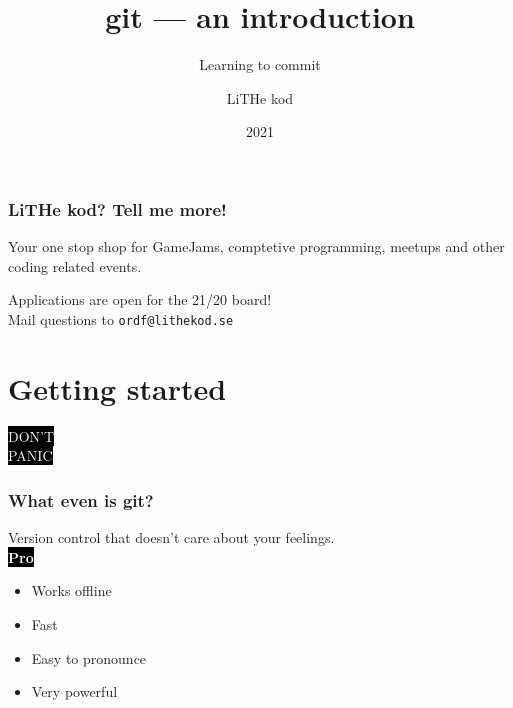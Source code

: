\documentclass{beamer}
\title[git]{git --- an introduction}
\subtitle{Learning to commit}
\author{LiTHe kod}
\date{2021}
\newcommand{\keyword}[1]{\hspace{-1.0em}\colorbox{black}{\textcolor{white}{\textbf{#1}\vphantom{Ep}}}\vspace{0.2em}} %
\begin{document}
\frame{\titlepage}
\frame{\tableofcontents}



\begin{frame}[fragile]
  \frametitle{LiTHe kod? Tell me more!}
  Your one stop shop for GameJams, comptetive programming, meetups and other coding related events.

  \vspace{2.0em}
  Applications are open for the 21/20 board! \\
  Mail questions to \texttt{ordf@lithekod.se} \\
\end{frame}

\section{Getting started}

\begin{frame}[fragile]
  \begin{center}
    \Huge \colorbox{black}{\textcolor{white}{DON'T}} \\
    \Huge \colorbox{black}{\textcolor{white}{PANIC}}
  \end{center}
\end{frame}

\begin{frame}[fragile]
  \frametitle{What even is git?}

  Version control that doesn't care about your feelings. \\

  \keyword{Pro}
  \begin{itemize}
    \item Works offline
    \item Fast
    \item Easy to pronounce
    \item Very powerful
  \end{itemize}

\end{frame}
\end{document}
